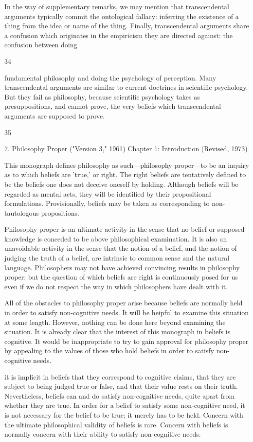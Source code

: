 \documentclass[10pt,twoside]{memoir}
\begin{document}
\begin{enumerate}
{{{{{In the way of supplementary remarks, we may mention that 
transcendental arguments typically commit the ontological fallacy: inferring 
the existence of a thing from the idea or name of the thing. Finally, 
transcendental arguments share a confusion which originates in the 
empiricism they are directed against: the confusion between doing 


34 


fundamental philosophy and doing the psychology of perception. Many 
transcendental arguments are similar to current doctrines in scientific 
psychology. But they fail as philosophy, because scientific psychology takes 
as presuppositions, and cannot prove, the very beliefs which transcendental 
arguments are supposed to prove. 


35 


7. Philosophy Proper ("Version 3," 1961) 
Chapter 1: Introduction (Revised, 1973) 


This monograph defines philosophy as such---philosophy proper---to be 
an inquiry as to which beliefs are 'true,' or right. The right beliefs are 
tentatively defined to be the beliefs one does not deceive oneself by holding. 
Although beliefs will be regarded as mental acts, they will be identified by 
their propositional formulations. Provisionally, beliefs may be taken as 
corresponding to non-tautologous propositions. 

Philosophy proper is an ultimate activity in the sense that no belief or 
supposed knowledge is conceded to be above philosophical examination. It is 
also an unavoidable activity in the sense that the notion of a belief, and the 
notion of judging the truth of a belief, are intrinsic to common sense and the 
natural language. Philosophers may not have achieved convincing results in 
philosophy proper; but the question of which beliefs are right is 
continuously posed for us even if we do not respect the way in which 
philosophers have dealt with it. 

All of the obstacles to philosophy proper arise because beliefs are 
normally held in order to satisfy non-cognitive needs. It will be heipful to 
examine this situation at some length. However, nothing can be done here 
beyond examining the situation. It is already clear that the interest of this 
monograph in beliefs is cognitive. It would be inappropriate to try to gain 
approval for philosophy proper by appealing to the values of those who hold 
beliefs in order to satisfy non-cognitive needs. 

it is implicit in beliefs that they correspond to cognitive claims, that 
they are subject to being judged true or false, and that their value rests on 
their truth. Nevertheless, beliefs can and do satisfy non-cognitive needs, 
quite apart from whether they are true. In order for a belief to satisfy some 
non-cognitive need, it is not necessary for the belief to be true; it merely has 
to be held. Concern with the ultimate philosophical validity of beliefs is rare. 
Concern with beliefs is normally concern with their ability to satisfy 
non-cognitive needs. 

}}}}}
\end{enumerate}
\end{document}
